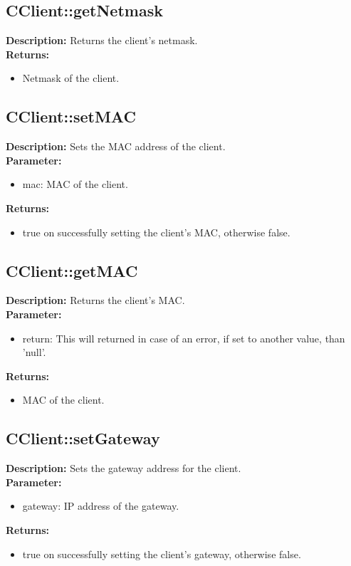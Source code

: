 \subsection{CClient::getNetmask}
\textbf{Description:} Returns the client's netmask.\\
\textbf{Returns:}
\begin{itemize}
\item Netmask of the client.
\end{itemize}

\subsection{CClient::setMAC}
\textbf{Description:} Sets the MAC address of the client.\\
\textbf{Parameter:}
\begin{itemize}
\item mac: MAC of the client.
\end{itemize}
\textbf{Returns:}
\begin{itemize}
\item true on successfully setting the client's MAC, otherwise false.
\end{itemize}

\subsection{CClient::getMAC}
\textbf{Description:} Returns the client's MAC.\\
\textbf{Parameter:}
\begin{itemize}
\item return: This will returned in case of an error, if set to another value, than 'null'.
\end{itemize}
\textbf{Returns:}
\begin{itemize}
\item MAC of the client.
\end{itemize}

\subsection{CClient::setGateway}
\textbf{Description:} Sets the gateway address for the client.\\
\textbf{Parameter:}
\begin{itemize}
\item gateway: IP address of the gateway.
\end{itemize}
\textbf{Returns:}
\begin{itemize}
\item true on successfully setting the client's gateway, otherwise false.
\end{itemize}

